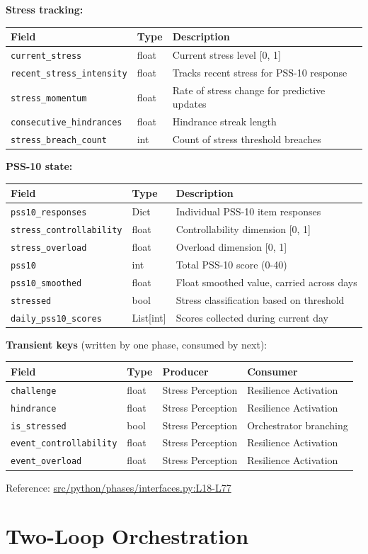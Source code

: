 \documentclass[
  letterpaper,
  DIV=11,
  numbers=noendperiod]{scrartcl}
\newcommand{\trow}[3]{%
  \texttt{\allowbreak #1} & #2 & #3 \\
}
\newcommand{\trowfour}[4]{%
  \texttt{\allowbreak #1} & #2 & #3 & #4 \\
}
\begin{document}
\textbf{Stress tracking:}

\begin{tabularx}{\textwidth}{p{4.5cm}p{1.2cm}X}
\toprule
\textbf{Field} & \textbf{Type} & \textbf{Description} \\
\midrule
\trow{current\_stress}{float}{Current stress level [0, 1]}
\trow{recent\_stress\_intensity}{float}{Tracks recent stress for PSS-10 response}
\trow{stress\_momentum}{float}{Rate of stress change for predictive updates}
\trow{consecutive\_hindrances}{float}{Hindrance streak length}
\trow{stress\_breach\_count}{int}{Count of stress threshold breaches}
\bottomrule
\end{tabularx}

\textbf{PSS-10 state:}

\begin{tabularx}{\textwidth}{p{4.5cm}p{2cm}X}
\toprule
\textbf{Field} & \textbf{Type} & \textbf{Description} \\
\midrule
\trow{pss10\_responses}{Dict}{Individual PSS-10 item responses}
\trow{stress\_controllability}{float}{Controllability dimension [0, 1]}
\trow{stress\_overload}{float}{Overload dimension [0, 1]}
\trow{pss10}{int}{Total PSS-10 score (0-40)}
\trow{pss10\_smoothed}{float}{Float smoothed value, carried across days}
\trow{stressed}{bool}{Stress classification based on threshold}
\trow{daily\_pss10\_scores}{List[int]}{Scores collected during current day}
\bottomrule
\end{tabularx}

\textbf{Transient keys} (written by one phase, consumed by next):

\begin{tabularx}{\textwidth}{p{4.5cm}p{1cm}p{3cm}X}
\toprule
\textbf{Field} & \textbf{Type} & \textbf{Producer} & \textbf{Consumer} \\
\midrule
\trowfour{challenge}{float}{Stress Perception}{Resilience Activation}
\trowfour{hindrance}{float}{Stress Perception}{Resilience Activation}
\trowfour{is\_stressed}{bool}{Stress Perception}{Orchestrator branching}
\trowfour{event\_controllability}{float}{Stress Perception}{Resilience Activation}
\trowfour{event\_overload}{float}{Stress Perception}{Resilience Activation}
\bottomrule
\end{tabularx}

Reference:
\href{https://github.com/namakala/abm-simulation/blob/84ff9b37fb0c569bef9f122e789d9c23a89348ec/src/python/phases/interfaces.py\#L18-L77}{src/python/phases/interfaces.py:L18-L77}

\section{Two-Loop Orchestration}\label{two-loop-orchestration}
\end{document}
